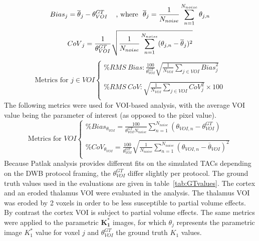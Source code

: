 
\begin{equation}
\label{eq:BiasImage}
{Bias}_{j}  = \overline{\theta}_{j} - \theta_{VOI}^{GT} \  \hspace{3mm} 
\text{, where } \ 
\overline{\theta}_{j}  = \frac{1}{N_{noise}} \sum_{n=1}^{N_{noise}} {\theta_{j,n}} \\ 
\end{equation}
%
%
\begin{equation}
\label{eq:CoVImage}
{CoV}_{j}  = \frac{1}{{\theta_{VOI}^{GT}}} \sqrt{\frac{1}{N_{noise}}\sum_{n=1}^{N_{noise}} (\theta_{j,n} - \overline{\theta}_{j} )^2}  \\
\end{equation}
%
\!
%
%
\begin{equation}
\label{eq:VoxMetrics}
\text{Metrics for } {j\in VOI}
\begin{cases}  
\% RMS\ {Bias} : \frac{100}{{\theta_{VOI}^{GT}}} \sqrt{\frac{1}{N_{VOI}} \sum_{j\in VOI} {Bias}_{j}^{2}} \\ \\  
\% RMS\ {CoV}  : \sqrt{\frac{1}{N_{VOI}} \sum_{j\in VOI} {CoV}_{j}^{2}}  \times100\\
\end{cases}
\end{equation}
The following metrics were used for VOI-based analysis, with the average VOI value being the parameter of interest (as opposed to the pixel value).
\begin{equation}
\text{Metrics for } {VOI}
\begin{cases}
\% {Bias}_{{\theta}_{VOI}} = \frac{100}{\theta_{VOI}^{GT} N_{noise} } \sum_{n=1}^{N_{noise}} ({\theta_{VOI,n} - \theta_{VOI}^{GT}}) \\ \\
\% CoV_{{\theta}_{VOI}} = \frac{100}{{\theta_{VOI}^{GT}}} \sqrt{ \frac{1}{N_{noise}} \sum_{n=1}^{N_{noise}} (\theta_{VOI,n} - \overline{\theta}_{VOI} )^2 }   \\ 
\end{cases}
\end{equation}
%
Because Patlak analysis provides different fits on the simulated TACs depending on the DWB protocol framing, the $\theta_{VOI}^{GT}$ differ slightly per protocol. The ground truth values used in the evaluations are given in table~\ref{tab:GTvalues}. 
The cortex and an eroded thalamus VOI were evaluated in the analysis.
The thalamus VOI was eroded by 2 voxels 
in order to be less susceptible to partial volume effects. By contrast the cortex VOI is subject to partial volume effects.
%
The same metrics were applied to the parametric $\boldsymbol{K_1^*}$ images, for which $\theta_{j}$ represents the parametric image $K_1^*$ value for voxel $j$ and $\theta_{VOI}^{GT}$ the ground truth $K_1$ values.

